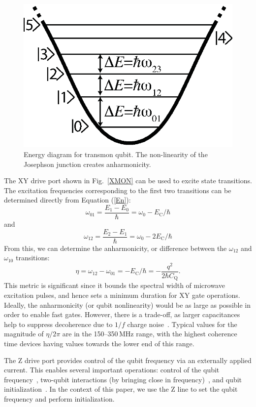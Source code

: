 \documentclass[journal]{IEEEtran}
\newcommand{\CR}[1]{{\color{black}#1}}
\begin{document}
\begin{figure}
\begin{center}
\includegraphics[width=0.6\columnwidth]{Figures/FIGURE_4}
\end{center}
\caption{Energy diagram for transmon qubit. The non-linearity of the Josephson junction creates anharmonicity.}\label{EnergyDiagram}
\end{figure}
The XY drive port shown in Fig.~\ref{XMON} can be used to excite state transitions. The excitation frequencies corresponding to the first two transitions can be determined directly from Equation (\ref{En}):
\begin{equation}
\omega_\text{01}=\frac{E_1-E_0}{\hbar}=\omega_0-E_\text{C}/\hbar
\end{equation}
and 
\begin{equation}
\omega_\text{12}=\frac{E_2-E_1}{\hbar}=\omega_0-2E_\text{C}/\hbar
\end{equation}
From this, we can determine the anharmonicity, or difference between the $\omega_\text{12}$ and $\omega_\text{10}$ transitions:
\begin{equation}
\eta=\omega_{12}-\omega_{01}=-E_\text{C}/\hbar=-\frac{q^2}{2\hbar{}C_\text{Q}}.
\end{equation}
This metric is significant since it bounds the spectral width of microwave excitation pulses, and hence sets a minimum duration for XY gate operations. 
Ideally, the anharmonicity (or qubit nonlinearity) would be as large as possible in order to enable fast gates. However, there is a trade-off, as larger capacitances help to suppress decoherence due to $1/f$ charge noise~\cite{koch2007charge}. Typical values for the magnitude of $\eta/2\pi$ are in the 150--350\,MHz range, with the highest coherence time devices having values towards the lower end of this range.


\CR{The Z drive port provides control of the qubit frequency via an externally applied current. This enables several important operations: control of the qubit frequency~\cite{majer2007coupling}, two-qubit interactions (by bringing close in frequency)~\cite{martinis2014fast}, and qubit initialization~\cite{chen2018metrology}. In the context of this paper, we use the Z line to set the qubit frequency and perform initialization. }
\end{document}
